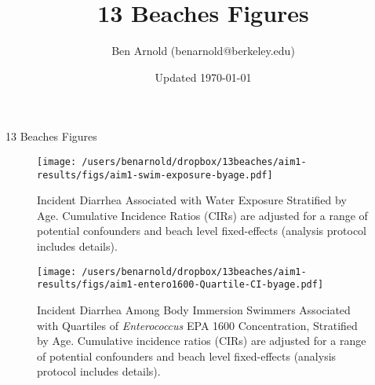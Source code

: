 \documentclass[11pt]{article}
\title{13 Beaches Figures}
\author{Ben Arnold (benarnold@berkeley.edu)}
\date{Updated \today}
\begin{document}
{\centerline {\LARGE 13 Beaches Figures} }


\begin{landscape}
\begin{figure}[htbp]
\begin{center}
\texttt{[image: /users/benarnold/dropbox/13beaches/aim1-results/figs/aim1-swim-exposure-byage.pdf]}
\begin{minipage}{1.2\textwidth}
\caption{Incident Diarrhea Associated with Water Exposure Stratified by Age. Cumulative Incidence Ratios (CIRs) are adjusted for a range of potential confounders and beach level fixed-effects (analysis protocol includes details).}
\label{fig:swimex}
\end{minipage}
\end{center}
\end{figure}
\end{landscape}

\begin{landscape}
\begin{figure}[htbp]
\begin{center}
\texttt{[image: /users/benarnold/dropbox/13beaches/aim1-results/figs/aim1-entero1600-Quartile-CI-byage.pdf]} 
\begin{minipage}{1.2\textwidth}
\caption{Incident Diarrhea Among Body Immersion Swimmers Associated with Quartiles of \textit{Enterococcus} EPA 1600 Concentration, Stratified by Age. Cumulative incidence ratios (CIRs) are adjusted for a range of potential confounders and beach level fixed-effects (analysis protocol includes details). }
\label{fig:enteroquartile}
\end{minipage}
\end{center}
\end{figure}
\end{landscape}
\end{document}
